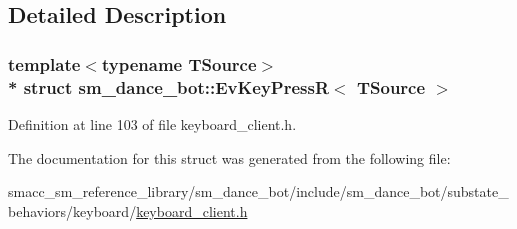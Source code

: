 \subsection{Detailed Description}
\subsubsection*{template$<$typename T\+Source$>$\\*
struct sm\+\_\+dance\+\_\+bot\+::\+Ev\+Key\+Press\+R$<$ T\+Source $>$}



Definition at line 103 of file keyboard\+\_\+client.\+h.



The documentation for this struct was generated from the following file\+:\begin{DoxyCompactItemize}
\item 
smacc\+\_\+sm\+\_\+reference\+\_\+library/sm\+\_\+dance\+\_\+bot/include/sm\+\_\+dance\+\_\+bot/substate\+\_\+behaviors/keyboard/\hyperlink{keyboard__client_8h}{keyboard\+\_\+client.\+h}\end{DoxyCompactItemize}
